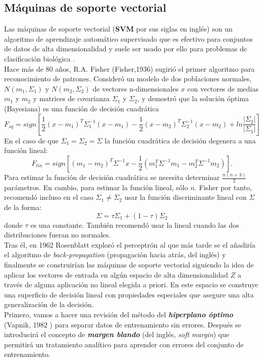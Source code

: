 \subsection{Máquinas de soporte vectorial}
Las máquinas de soporte vectorial (\textbf{SVM} por sus siglas en inglés) son un algoritmo de aprendizaje automático supervisado que es efectivo para conjuntos de datos de alta dimensionalidad y suele ser usado por ello para problemas de clasificación biológica \cite{10.1093/bioinformatics/btw498} \cite{cortes1995support}.\\
Hace más de $80$ años, R.A. Fisher (Fisher,1936) sugirió el primer algoritmo para reconocimiento de patrones. Consideró un modelo de dos poblaciones normales, $N(m_1,\Sigma_1)$ y $N(m_2,\Sigma_2)$ de vectores n-dimensionales $x$ con vectores de medias $m_1$ y $m_2$ y matrices de covarianza $\Sigma_1$ y $\Sigma_2$, y demostró que la solución óptima (Bayesiana) es una función de decisión cuadrática
\[ F_{sq}=sign \left[ \frac{1}{2}(x-m_1)^T \Sigma^{-1}_1 (x-m_1) - \frac{1}{2} (x-m_2)^T \Sigma_2^{-1} (x-m_2) + ln \frac{\vert \Sigma_2 \vert}{\vert \Sigma_1 \vert} \right] \]
En el caso de que $\Sigma_1=\Sigma_2=\Sigma$ la función cuadrática de decisión degenera a una función lineal:
\[ F_{lin}=sign \left[ (m_1-m_2)^T \Sigma^{-1} x - \frac{1}{2}(m_1^T \Sigma^{-1}m_1-m_2^T \Sigma^{-1}m_2)  \right]. \]
Para estimar la función de decisión cuadrática se necesita determinar $\frac{n(n+3)}{2}$ parámetros. En cambio, para estimar la función lineal, sólo $n$. Fisher por tanto, recomendó incluso en el caso $\Sigma_1 \neq \Sigma_2$ usar la función discriminante lineal con $\Sigma$ de la forma:
\[ \Sigma = \tau \Sigma_1 + (1-\tau)\Sigma_2 \]
donde $\tau$ es una constante. También recomendó usar la lineal cuando las dos distribuciones fueran no normales. \cite{cortes1995support}\\
Tras él, en 1962 Rosenblatt exploró el perceptrón al que más tarde se el añadiría el algoritmo de \textit{back-propagation} (propagación hacia atrás, del inglés) y finalmente se construirían las máquinas de soporte vectorial siguiendo la idea de aplicar los vectores de entrada en algún espacio de alta dimensionalidad $Z$ a través de alguna aplicación no lineal elegida a priori. En este espacio se construye una superficio de decisión lineal con propiedades especiales que asegure una alta generalización de la decisión. \cite{cortes1995support}\\
Primero, vamos a hacer una revisión del método del \textbf{\textit{hiperplano óptimo}} (Vapnik, 1982 \cite{cortes1995support}) para separar datos de entrenamiento sin errores. Después se introducirá el concepto de \textbf{\textit{margen blando}} (del inglés, \textit{soft margin}) que permitirá un tratamiento analítico para aprender con errores del conjunto de entrenamiento.\\

